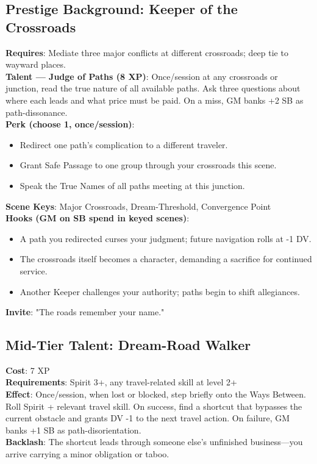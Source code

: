 \subsection*{Prestige Background: Keeper of the Crossroads}
\textbf{Requires}: Mediate three major conflicts at different crossroads; deep tie to wayward places. \\
\textbf{Talent --- Judge of Paths (8 XP)}: Once/session at any crossroads or junction, read the true nature of all available paths. Ask three questions about where each leads and what price must be paid. On a miss, GM banks +2 SB as path-dissonance. \\
\textbf{Perk (choose 1, once/session)}:
\begin{itemize}
    \item Redirect one path's complication to a different traveler.
    \item Grant Safe Passage to one group through your crossroads this scene.
    \item Speak the True Names of all paths meeting at this junction.
\end{itemize}
\textbf{Scene Keys}: Major Crossroads, Dream-Threshold, Convergence Point \\
\textbf{Hooks (GM on SB spend in keyed scenes)}:
\begin{itemize}
    \item A path you redirected curses your judgment; future navigation rolls at -1 DV.
    \item The crossroads itself becomes a character, demanding a sacrifice for continued service.
    \item Another Keeper challenges your authority; paths begin to shift allegiances.
\end{itemize}
\textbf{Invite}: "The roads remember your name."

\subsection*{Mid-Tier Talent: Dream-Road Walker}
\textbf{Cost}: 7 XP \\
\textbf{Requirements}: Spirit 3+, any travel-related skill at level 2+ \\
\textbf{Effect}: Once/session, when lost or blocked, step briefly onto the Ways Between. Roll Spirit + relevant travel skill. On success, find a shortcut that bypasses the current obstacle and grants DV -1 to the next travel action. On failure, GM banks +1 SB as path-disorientation. \\
\textbf{Backlash}: The shortcut leads through someone else's unfinished business---you arrive carrying a minor obligation or taboo.

